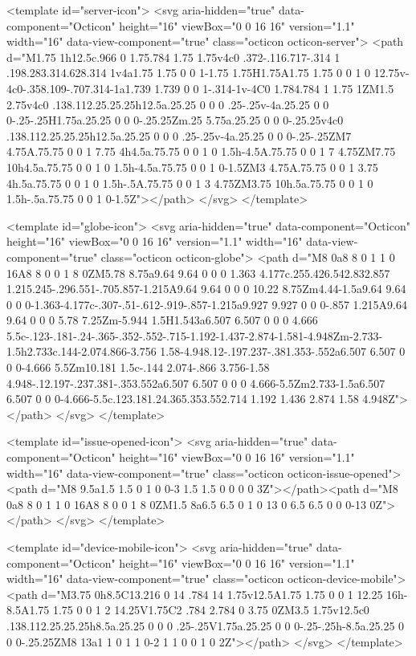 <template id="server-icon">
  <svg aria-hidden="true" data-component="Octicon" height="16" viewBox="0 0 16 16" version="1.1" width="16" data-view-component="true" class="octicon octicon-server">
    <path d="M1.75 1h12.5c.966 0 1.75.784 1.75 1.75v4c0 .372-.116.717-.314 1 .198.283.314.628.314 1v4a1.75 1.75 0 0 1-1.75 1.75H1.75A1.75 1.75 0 0 1 0 12.75v-4c0-.358.109-.707.314-1a1.739 1.739 0 0 1-.314-1v-4C0 1.784.784 1 1.75 1ZM1.5 2.75v4c0 .138.112.25.25.25h12.5a.25.25 0 0 0 .25-.25v-4a.25.25 0 0 0-.25-.25H1.75a.25.25 0 0 0-.25.25Zm.25 5.75a.25.25 0 0 0-.25.25v4c0 .138.112.25.25.25h12.5a.25.25 0 0 0 .25-.25v-4a.25.25 0 0 0-.25-.25ZM7 4.75A.75.75 0 0 1 7.75 4h4.5a.75.75 0 0 1 0 1.5h-4.5A.75.75 0 0 1 7 4.75ZM7.75 10h4.5a.75.75 0 0 1 0 1.5h-4.5a.75.75 0 0 1 0-1.5ZM3 4.75A.75.75 0 0 1 3.75 4h.5a.75.75 0 0 1 0 1.5h-.5A.75.75 0 0 1 3 4.75ZM3.75 10h.5a.75.75 0 0 1 0 1.5h-.5a.75.75 0 0 1 0-1.5Z"></path>
</svg>
</template>

<template id="globe-icon">
  <svg aria-hidden="true" data-component="Octicon" height="16" viewBox="0 0 16 16" version="1.1" width="16" data-view-component="true" class="octicon octicon-globe">
    <path d="M8 0a8 8 0 1 1 0 16A8 8 0 0 1 8 0ZM5.78 8.75a9.64 9.64 0 0 0 1.363 4.177c.255.426.542.832.857 1.215.245-.296.551-.705.857-1.215A9.64 9.64 0 0 0 10.22 8.75Zm4.44-1.5a9.64 9.64 0 0 0-1.363-4.177c-.307-.51-.612-.919-.857-1.215a9.927 9.927 0 0 0-.857 1.215A9.64 9.64 0 0 0 5.78 7.25Zm-5.944 1.5H1.543a6.507 6.507 0 0 0 4.666 5.5c-.123-.181-.24-.365-.352-.552-.715-1.192-1.437-2.874-1.581-4.948Zm-2.733-1.5h2.733c.144-2.074.866-3.756 1.58-4.948.12-.197.237-.381.353-.552a6.507 6.507 0 0 0-4.666 5.5Zm10.181 1.5c-.144 2.074-.866 3.756-1.58 4.948-.12.197-.237.381-.353.552a6.507 6.507 0 0 0 4.666-5.5Zm2.733-1.5a6.507 6.507 0 0 0-4.666-5.5c.123.181.24.365.353.552.714 1.192 1.436 2.874 1.58 4.948Z"></path>
</svg>
</template>

<template id="issue-opened-icon">
  <svg aria-hidden="true" data-component="Octicon" height="16" viewBox="0 0 16 16" version="1.1" width="16" data-view-component="true" class="octicon octicon-issue-opened">
    <path d="M8 9.5a1.5 1.5 0 1 0 0-3 1.5 1.5 0 0 0 0 3Z"></path><path d="M8 0a8 8 0 1 1 0 16A8 8 0 0 1 8 0ZM1.5 8a6.5 6.5 0 1 0 13 0 6.5 6.5 0 0 0-13 0Z"></path>
</svg>
</template>

<template id="device-mobile-icon">
  <svg aria-hidden="true" data-component="Octicon" height="16" viewBox="0 0 16 16" version="1.1" width="16" data-view-component="true" class="octicon octicon-device-mobile">
    <path d="M3.75 0h8.5C13.216 0 14 .784 14 1.75v12.5A1.75 1.75 0 0 1 12.25 16h-8.5A1.75 1.75 0 0 1 2 14.25V1.75C2 .784 2.784 0 3.75 0ZM3.5 1.75v12.5c0 .138.112.25.25.25h8.5a.25.25 0 0 0 .25-.25V1.75a.25.25 0 0 0-.25-.25h-8.5a.25.25 0 0 0-.25.25ZM8 13a1 1 0 1 1 0-2 1 1 0 0 1 0 2Z"></path>
</svg>
</template>

